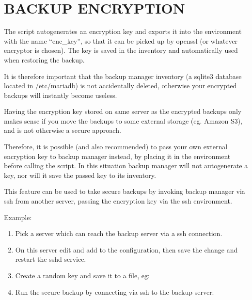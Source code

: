 \documentclass[letterpaper,10pt,english]{sphinxmanual}
\begin{document}
\section{BACKUP ENCRYPTION}
\label{\detokenize{mariadb-backup-manager:backup-encryption}}
\sphinxAtStartPar
The script autogenerates an encryption key and exports it into the environment with the name
“enc\_key”, so that it can be picked up by openssl (or whatever encryptor is chosen).
The key is saved in the inventory and automatically used when restoring the backup.

\sphinxAtStartPar
It is therefore important that the backup manager inventory (a sqlite3 database located in
/etc/mariadb) is not accidentally deleted, otherwise your encrypted backups will instantly
become useless.

\sphinxAtStartPar
Having the encryption key stored on same server as the encrypted backups only makes sense
if you move the backups to some external storage (eg. Amazon S3), and is not otherwise
a secure approach.

\sphinxAtStartPar
Therefore, it is possible (and also recommended) to pass your own external encryption key
to backup manager instead, by placing it in the environment before calling the script.  In this
situation backup manager will not autogenerate a key, nor will it save the passed key to its
inventory.

\sphinxAtStartPar
This feature can be used to take secure backups by invoking backup manager via ssh from another
server, passing the encryption key via the ssh environment.

\sphinxAtStartPar
Example:
\begin{enumerate}
%
\item {} 
\sphinxAtStartPar
Pick a server which can reach the backup server via a ssh connection.

\item {} 
\sphinxAtStartPar
On this server edit  and add  to the configuration,
then save the change and restart the sshd service.

\item {} 
\sphinxAtStartPar
Create a random key and save it to a file, eg:

\item {} 
\sphinxAtStartPar
Run the secure backup by connecting via ssh to the backup server:

\end{enumerate}
\end{document}
